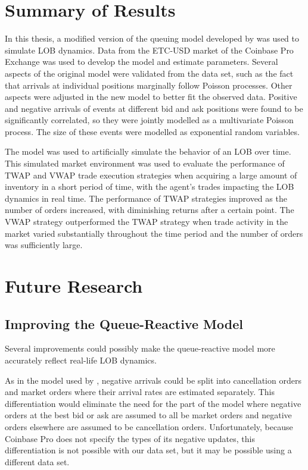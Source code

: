 \section{Summary of Results}
In this thesis, a modified version of the queuing model developed by \cite{A6} was used to simulate LOB dynamics. Data from the ETC-USD market of the Coinbase Pro Exchange was used to develop the model and estimate parameters. Several aspects of the original model were validated from the data set, such as the fact that arrivals at individual positions marginally follow Poisson processes. Other aspects were adjusted in the new model to better fit the observed data. Positive and negative arrivals of events at different bid and ask positions were found to be significantly correlated, so they were jointly modelled as a multivariate Poisson process. The size of these events were modelled as exponential random variables. 

The model was used to artificially simulate the behavior of an LOB over time. This simulated market environment was used to evaluate the performance of TWAP and VWAP trade execution strategies when acquiring a large amount of inventory in a short period of time, with the agent's trades impacting the LOB dynamics in real time. The performance of TWAP strategies improved as the number of orders increased, with diminishing returns after a certain point. The VWAP strategy outperformed the TWAP strategy when trade activity in the market varied substantially throughout the time period and the number of orders was sufficiently large.

\section{Future Research}
\subsection{Improving the Queue-Reactive Model}
Several improvements could possibly make the queue-reactive model more accurately reflect real-life LOB dynamics. 

As in the model used by \cite{A6}, negative arrivals could be split into cancellation orders and market orders where their arrival rates are estimated separately. This differentiation would eliminate the need for the part of the model where negative orders at the best bid or ask are assumed to all be market orders and negative orders elsewhere are assumed to be cancellation orders. Unfortunately, because Coinbase Pro does not specify the types of its negative updates, this differentiation is not possible with our data set, but it may be possible using a different data set.

